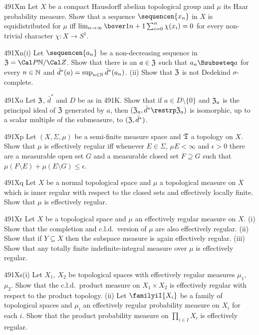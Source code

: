 {\spheader 491Xm Let $X$ be a compact Hausdorff abelian topological
group and $\mu$ its Haar probability measure.   Show that a sequence
$\sequencen{x_n}$ in $X$ is equidistributed for $\mu$ iff
$\lim_{n\to\infty}\bover1{n+1}\sum_{i=0}^n\chi(x_i)=0$ for every
non-trivial character $\chi:X\to S^1$.   

\spheader 491Xn(i) Let $\sequencen{a_n}$ be a non-decreasing sequence
in $\frak Z=\Cal P\Bbb N/\Cal Z$.   Show that there is an $a\in\frak Z$
such that $a_n\Bsubseteq a$ for every $n\in\Bbb N$ and
$\bar d^*(a)=\sup_{n\in\Bbb N}\bar d^*(a_n)$.
(ii) Show that $\frak Z$ is not Dedekind $\sigma$-complete.

\spheader 491Xo Let $\frak Z$, $\bar d^*$ and $D$ be as in 491K.   Show
that if $a\in D\setminus\{0\}$ and $\frak Z_a$ is the principal ideal of
$\frak Z$ generated by $a$, then $(\frak Z_a,\bar d^*\restrp\frak Z_a)$
is isomorphic, up to a scalar multiple of the submeasure, to
$(\frak Z,\bar d^*)$.

\spheader 491Xp Let $(X,\Sigma,\mu)$ be a semi-finite measure space
and
$\frak T$ a topology on $X$.   Show that $\mu$ is effectively regular
iff whenever $E\in\Sigma$,
$\mu E<\infty$ and $\epsilon>0$ there are a measurable open set $G$
and
a measurable closed set $F\supseteq G$ such that $\mu(F\setminus
E)+\mu(E\setminus G)\le\epsilon$.

\spheader 491Xq Let $X$ be a normal topological space and $\mu$ a
topological measure on $X$ which is inner regular with respect to the
closed sets and effectively locally finite.
Show that $\mu$ is effectively regular.

\spheader 491Xr Let $X$ be a topological space and $\mu$ an
effectively
regular measure on $X$.   (i) Show that the completion and c.l.d.\
version of $\mu$ are also effectively regular.   (ii) Show that if
$Y\subseteq X$ then the subspace measure is again effectively regular.
(iii) Show that any totally
finite indefinite-integral measure over $\mu$ is effectively regular.

\spheader 491Xs(i) Let $X_1$, $X_2$ be topological spaces with
effectively regular measures $\mu_1$, $\mu_2$.   Show that the c.l.d.\
product measure on $X_1\times X_2$ is
effectively regular with respect to the product topology.   
(ii) Let $\familyiI{X_i}$ be a family of topological spaces and $\mu_i$
an effectively regular probability
measure on $X_i$ for each $i$.   Show that the product probability
measure on $\prod_{i\in I}X_i$ is effectively regular.

}
